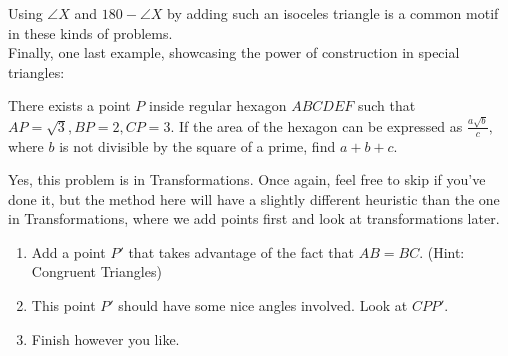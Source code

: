 \documentclass[11pt]{article}
\begin{document}
Using $\angle X$ and $180-\angle X$ by adding such an isoceles triangle is a common motif in these kinds of problems.\\
Finally, one last example, showcasing the power of construction in special triangles:\\
\begin{exam}
There exists a point $P$ inside regular hexagon $ABCDEF$ such that $AP=\sqrt{3},BP=2,CP=3.$ If the area of the hexagon can be expressed as $\frac{a\sqrt{b}}{c},$ where $b$ is not divisible by the square of a prime, find $a+b+c.$
\end{exam}
Yes, this problem is in Transformations. Once again, feel free to skip if you've done it, but the method here will have a slightly different heuristic than the one in Transformations, where we add points first and look at transformations later.\\
\begin{walk}
    \begin{enumerate}
        \item Add a point $P'$ that takes advantage of the fact that $AB = BC$. (Hint: Congruent Triangles)
        \item This point $P'$ should have some nice angles involved. Look at $CPP'$. 
        \item Finish however you like.
    \end{enumerate}
\end{walk}
\end{document}
